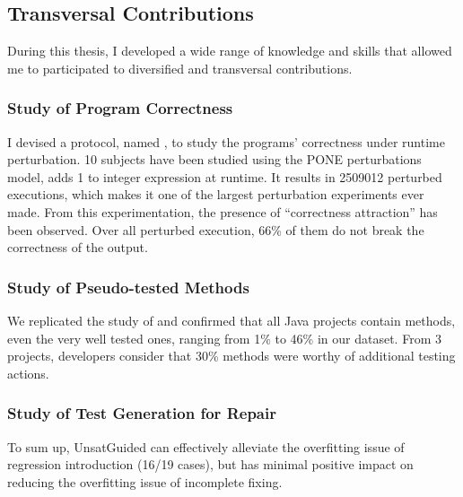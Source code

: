 \subsection{Transversal Contributions}
\label{subsec:conclusion:contributions-summary:transversal-contributions}

During this thesis, I developed a wide range of knowledge and skills that allowed me to participated to diversified and transversal contributions.

\subsubsection{Study of Program Correctness}
\label{subsubsec:conclusion:contributions-summary:transversal-contributions:correctness-attraction}

I devised a protocol, named \perturb, to study the programs' correctness under runtime perturbation.
10 subjects have been studied using the PONE perturbations model, \ie adds 1 to integer expression at runtime.
It results in 2509012 perturbed executions, which makes it one of the largest perturbation experiments ever made.
From this experimentation, the presence of ``correctness attraction'' has been observed. 
Over all perturbed execution, 66\% of them do not break the correctness of the output. 

\subsubsection{Study of Pseudo-tested Methods}
\label{subsubsec:conclusion:contributions-summary:transversal-contributions:pseudo-tested}

We replicated the study of \theoriginalauthors and confirmed that all Java projects contain \pseudotested{} methods, even the very well tested ones, ranging from 1\% to 46\% in our dataset.
From 3 projects, developers consider that 30\% methods were worthy of additional testing actions.

\subsubsection{Study of Test Generation for Repair}
\label{subsubsec:conclusion:contributions-summary:transversal-contributions:test-for-repair}

To sum up, UnsatGuided can effectively alleviate the overfitting issue of regression introduction (16/19 cases), but has minimal positive impact on reducing the overfitting issue of incomplete fixing.

